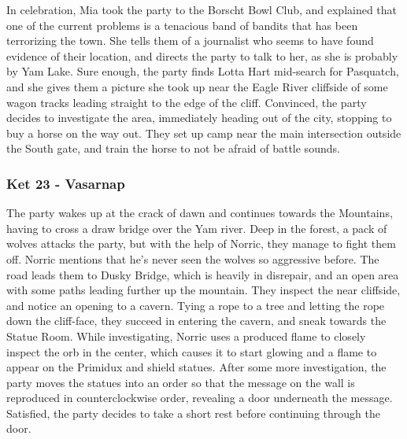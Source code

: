 In celebration, Mia took the party to the Borscht Bowl Club, and explained that one of the current problems is a tenacious band of bandits that has been terrorizing the town. She tells them of a journalist who seems to have found evidence of their location, and directs the party to talk to her, as she is probably by Yam Lake. Sure enough, the party finds Lotta Hart mid-search for Pasquatch, and she gives them a picture she took up near the Eagle River cliffside of some wagon tracks leading straight to the edge of the cliff. Convinced, the party decides to investigate the area, immediately heading out of the city, stopping to buy a horse on the way out. They set up camp near the main intersection outside the South gate, and train the horse to not be afraid of battle sounds.

\subsubsection{Ket 23 - Vasarnap}
The party wakes up at the crack of dawn and continues towards the Mountains, having to cross a draw bridge over the Yam river. Deep in the forest, a pack of wolves attacks the party, but with the help of Norric, they manage to fight them off. Norric mentions that he's never seen the wolves so aggressive before. The road leads them to Dusky Bridge, which is heavily in disrepair, and an open area with some paths leading further up the mountain. They inspect the near cliffside, and notice an opening to a cavern. Tying a rope to a tree and letting the rope down the cliff-face, they succeed in entering the cavern, and sneak towards the Statue Room. While investigating, Norric uses a produced flame to closely inspect the orb in the center, which causes it to start glowing and a flame to appear on the Primidux and shield statues. After some more investigation, the party moves the statues into an order so that the message on the wall is reproduced in counterclockwise order, revealing a door underneath the message. Satisfied, the party decides to take a short rest before continuing through the door.


